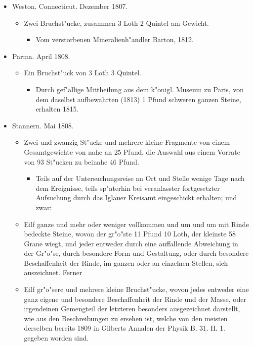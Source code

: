 \documentclass[a4paper, 11pt, oneside, polutonikogreek, german]{article}
\begin{document}
\begin{itemize}
\begin{itemize}
    \end{itemize}
    \item Weston, Connecticut. Dezember 1807.
    \begin{itemize}
        \item Zwei Bruchst"ucke, zusammen 3 Loth 2 Quintel am Gewicht.
        \begin{itemize}
            \item Vom verstorbenen Mineralienh"andler Barton, 1812.
        \end{itemize}
    \end{itemize}
    \item Parma. April 1808.
    \begin{itemize}
        \item Ein Bruchst"uck von 3 Loth 3 Quintel.
        \begin{itemize}
            \item Durch gef"allige Mittheilung aus dem k"onigl. Museum zu Paris, von dem daselbst aufbewahrten (1813) 1 Pfund schweren ganzen Steine, erhalten 1815.
        \end{itemize}
    \end{itemize}
    \item Stannern. Mai 1808.
    \begin{itemize}
        \item Zwei und zwanzig St"ucke und mehrere kleine Fragmente von einem Gesamtgewichte von nahe an 25 Pfund, die Auswahl aus einem Vorrate von 93 St"ucken zu beinahe 46 Pfund.
        \begin{itemize}
            \item Teils auf der Untersuchungsreise an Ort und Stelle wenige Tage nach dem Ereignisse, teils sp"aterhin bei veranlasster fortgesetzter Aufsuchung durch das Iglauer Kreisamt eingeschickt erhalten; und zwar:
        \end{itemize}
        \item Eilf ganze und mehr oder weniger vollkommen und um und um mit Rinde bedeckte Steine, wovon der gr"o"ste 11 Pfund 10 Loth, der kleinste 58 Grane wiegt, und jeder entweder durch eine auffallende Abweichung in der Gr"o"se, durch besondere Form und Gestaltung, oder durch besondere Beschaffenheit der Rinde, im ganzen oder an einzelnen Stellen, sich auszeichnet. Ferner
        \item Eilf gr"o"sere und mehrere kleine Bruchst"ucke, wovon jedes entweder eine ganz eigene und besondere Beschaffenheit der Rinde und der Masse, oder irgendeinen Gemengteil der letzteren besonders ausgezeichnet darstellt, wie aus den Beschreibungen zu ersehen ist, welche von den meisten derselben bereits 1809 in Gilberts Annalen der Physik B. 31. H. 1. gegeben worden sind.

\end{itemize}
\end{itemize}
\end{document}
